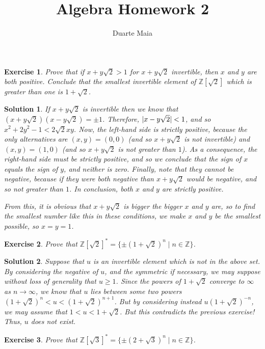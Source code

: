 \documentclass{article}
\title{Algebra Homework 2}
\author{Duarte Maia}
\newtheorem{ex}{Exercise}
\theoremstyle{nonumberplain}
\newtheorem{sol}{Solution}
\newcommand{\Z}{\mathbb{Z}}
\DeclarePairedDelimiter{\abs}{\lvert}{\rvert}
\begin{document}
\maketitle

\setcounter{ex}{7}

\begin{ex}
Prove that if $x + y \sqrt2 > 1$ for $x+y \sqrt 2$ invertible, then $x$ and $y$ are both positive. Conclude that the smallest invertible element of $\Z[\sqrt2]$ which is greater than one is $1+\sqrt2$.
\end{ex}

\begin{sol}
If $x+y\sqrt2$ is invertible then we know that $(x+y\sqrt2)(x-y\sqrt2) = \pm 1$. Therefore, $\abs{x-y\sqrt2} < 1$, and so $x^2 + 2 y^2 - 1 < 2 \sqrt 2 x y$. Now, the left-hand side is strictly positive, because the only alternatives are $(x,y) = (0,0)$ (and so $x+y\sqrt2$ is not invertible) and $(x,y) = (1,0)$ (and so $x+y\sqrt2$ is not greater than $1$). As a consequence, the right-hand side must be strictly positive, and so we conclude that the sign of $x$ equals the sign of $y$, and neither is zero. Finally, note that they cannot be negative, because if they were both negative than $x+y\sqrt2$ would be negative, and so not greater than $1$. In conclusion, both $x$ and $y$ are strictly positive.

From this, it is obvious that $x+y\sqrt2$ is bigger the bigger $x$ and $y$ are, so to find the smallest number like this in these conditions, we make $x$ and $y$ be the smallest possible, so $x=y=1$.
\end{sol}

\begin{ex}
Prove that $\Z[\sqrt2]^* = \{\pm (1+\sqrt2)^n \mid n \in \Z\}$.
\end{ex}

\begin{sol}
Suppose that $u$ is an invertible element which is not in the above set. By considering the negative of $u$, and the symmetric if necessary, we may suppose without loss of generality that $u \geq 1$. Since the powers of $1+\sqrt2$ converge to $\infty$ as $n \to \infty$, we know that $u$ lies between some two powers $(1+\sqrt2)^n < u < (1+\sqrt2)^{n+1}$. But by considering instead $u (1+\sqrt2)^{-n}$, we may assume that $1<u<1+\sqrt2$. But this contradicts the previous exercise! Thus, $u$ does not exist.
\end{sol}

\begin{ex}
Prove that $\Z[\sqrt3]^* = \{\pm(2+\sqrt3)^n \mid n \in \Z\}$.
\end{ex}
\end{document}
